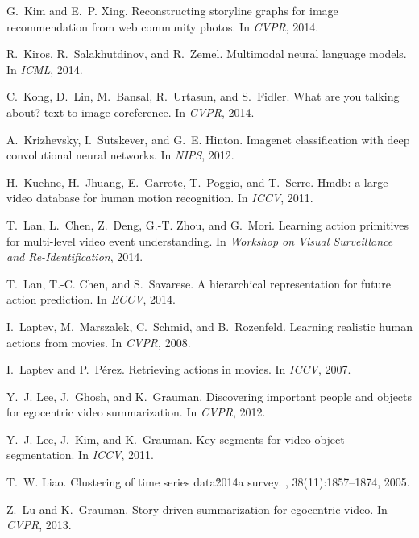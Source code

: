\documentclass[10pt,twocolumn,letterpaper]{article}
\begin{document}
\begin{thebibliography}{10}
G.~Kim and E.~P. Xing.
\newblock Reconstructing storyline graphs for image recommendation from web
  community photos.
\newblock In {\em CVPR}, 2014.

R.~Kiros, R.~Salakhutdinov, and R.~Zemel.
\newblock Multimodal neural language models.
\newblock In {\em ICML}, 2014.

C.~Kong, D.~Lin, M.~Bansal, R.~Urtasun, and S.~Fidler.
\newblock What are you talking about? text-to-image coreference.
\newblock In {\em CVPR}, 2014.

A.~Krizhevsky, I.~Sutskever, and G.~E. Hinton.
\newblock Imagenet classification with deep convolutional neural networks.
\newblock In {\em NIPS}, 2012.

H.~Kuehne, H.~Jhuang, E.~Garrote, T.~Poggio, and T.~Serre.
\newblock Hmdb: a large video database for human motion recognition.
\newblock In {\em ICCV}, 2011.

T.~Lan, L.~Chen, Z.~Deng, G.-T. Zhou, and G.~Mori.
\newblock Learning action primitives for multi-level video event understanding.
\newblock In {\em Workshop on Visual Surveillance and Re-Identification}, 2014.

T.~Lan, T.-C. Chen, and S.~Savarese.
\newblock A hierarchical representation for future action prediction.
\newblock In {\em ECCV}, 2014.

I.~Laptev, M.~Marszalek, C.~Schmid, and B.~Rozenfeld.
\newblock Learning realistic human actions from movies.
\newblock In {\em CVPR}, 2008.

I.~Laptev and P.~P\'{e}rez.
\newblock Retrieving actions in movies.
\newblock In {\em ICCV}, 2007.

Y.~J. Lee, J.~Ghosh, and K.~Grauman.
\newblock Discovering important people and objects for egocentric video
  summarization.
\newblock In {\em CVPR}, 2012.

Y.~J. Lee, J.~Kim, and K.~Grauman.
\newblock Key-segments for video object segmentation.
\newblock In {\em ICCV}, 2011.

T.~W. Liao.
\newblock Clustering of time series data\u2014a survey.
, 38(11):1857--1874, 2005.

Z.~Lu and K.~Grauman.
\newblock Story-driven summarization for egocentric video.
\newblock In {\em CVPR}, 2013.


\end{thebibliography}
\end{document}
